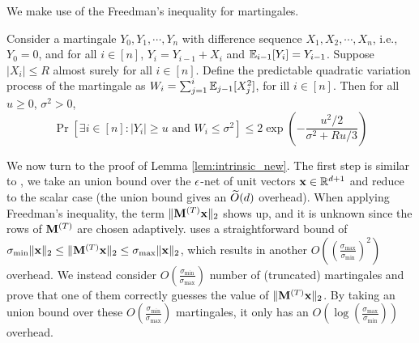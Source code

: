 We make use of the Freedman's inequality for martingales. 
\begin{lemma}\label{thm:freedman}
Consider a martingale $Y_0, Y_1, \cdots, Y_n$ with difference sequence $X_1, X_2, \cdots, X_n$, i.e., $Y_0 = 0$, and for all $i \in [n]$, $Y_i = Y_{i-1} + X_i$ and $\operatorname*{{\mathbb{E}}}_{i-1}[Y_i] = Y_{i-1}$. Suppose $|X_i| \leq R$ almost surely for all $i \in [n]$. Define the predictable quadratic variation process of the martingale as $W_i = \sum_{j=1}^{i} \operatorname*{{\mathbb{E}}}_{j-1}[X_j^2]$, for ill $i \in [n]$. Then for all $u \geq 0$, $\sigma^2 > 0$,
\[
\Pr\left[ \exists i \in [n]: |Y_i| \geq u \text{ and } W_i \leq \sigma^2 \right] \leq 2 \exp\left(-\frac{u^2/2}{\sigma^2 + R u / 3}\right)
\]
\end{lemma}






We now turn to the proof of Lemma \ref{lem:intrinsic_new}.
The first step is similar to \cite{bhm+21}, we take an union bound over the $\epsilon$-net of unit vectors $\mathbf{x}\in \mathbb{R}^{d+1}$ and reduce to the scalar case (the union bound gives an $\widetilde{O}(d)$ overhead).
When applying Freedman's inequality, the term $\|\mathbf{M}^{(T)} \mathbf{x}\|_2$ shows up, and it is unknown since the rows of $\mathbf{M}^{(T)}$ are chosen adaptively. 
\cite{bhm+21} uses a straightforward bound of $\sigma_{\min} \|\mathbf{x}\|_2 \leq \|\mathbf{M}^{(T)} \mathbf{x}\|_2 \leq \sigma_{\max} \|\mathbf{x}\|_2$, which results in another $O((\frac{\sigma_{\max}}{\sigma_{\min}})^2)$ overhead. 
We instead consider $O(\frac{\sigma_{\min}}{\sigma_{\max}})$ number of (truncated) martingales and prove that one of them correctly guesses the value of $\|\mathbf{M}^{(T)} \mathbf{x}\|_2$. By taking an union bound over these $O(\frac{\sigma_{\min}}{\sigma_{\max}})$ martingales, it only has an $O(\log(\frac{\sigma_{\max}}{\sigma_{\min}}))$ overhead.


